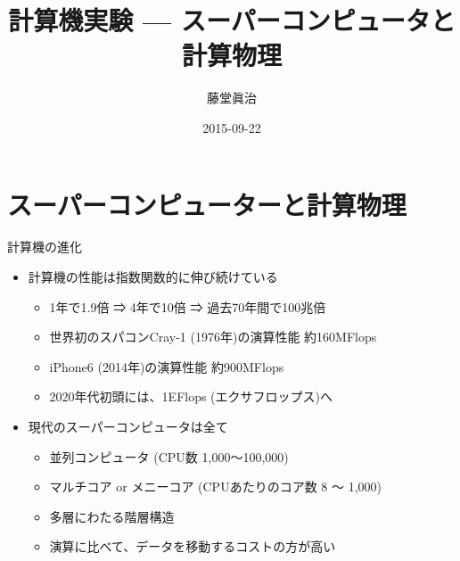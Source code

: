 \documentclass[dvipdfmx]{beamer}
\title{計算機実験 --- スーパーコンピュータと計算物理}
\author{藤堂眞治}
\date{2015-09-22}
\begin{document}

\begin{frame}
  \titlepage
  \tableofcontents
\end{frame}

\section{スーパーコンピューターと計算物理}

\begin{frame}[t,fragile]{計算機の進化}
  \begin{itemize}
    \setlength{\itemsep}{1em}
  \item 計算機の性能は指数関数的に伸び続けている
    \begin{itemize}
    \item 1年で1.9倍 ⇒ 4年で10倍 ⇒ 過去70年間で100兆倍
    \item 世界初のスパコンCray-1 (1976年)の演算性能 約160MFlops
    \item iPhone6 (2014年)の演算性能 約900MFlops
    \item 2020年代初頭には、1EFlops (エクサフロップス)へ
    \end{itemize}
  \item 現代のスーパーコンピュータは全て
    \begin{itemize}
      \item 並列コンピュータ (CPU数 1,000〜100,000)
      \item マルチコア or メニーコア (CPUあたりのコア数 8 〜 1,000)
      \item 多層にわたる階層構造
      \item 演算に比べて、データを移動するコストの方が高い
    \end{itemize}
  \end{itemize}
\end{frame}
\end{document}
